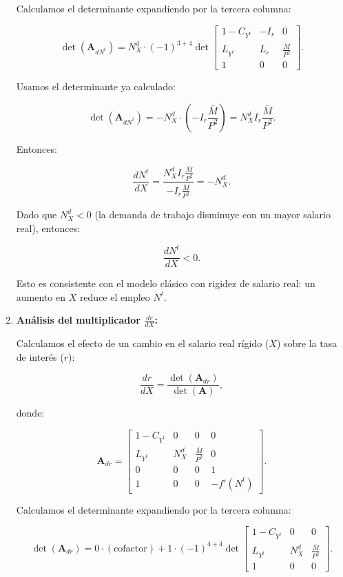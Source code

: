\documentclass[
  doc,
  floatsintext,
  longtable,
  a4paper,
  nolmodern,
  notxfonts,
  notimes,
  colorlinks=true,linkcolor=blue,citecolor=blue,urlcolor=blue]{apa7}
\begin{document}
\begin{enumerate}
  Calculamos el determinante expandiendo por la tercera columna:

  \[
  \det(\mathbf{A}_{dN^t}) = N^d_X \cdot (-1)^{3+4} \det \begin{bmatrix}
  1 - C_{Y^t} & -I_r & 0 \\
  L_{Y^t} & L_r & \frac{\bar{M}}{P^2} \\
  1 & 0 & 0
  \end{bmatrix}.
  \]

  Usamos el determinante ya calculado:

  \[
  \det(\mathbf{A}_{dN^t}) = -N^d_X \cdot \left( -I_r \frac{\bar{M}}{P^2} \right) = N^d_X I_r \frac{\bar{M}}{P^2}.
  \]

  Entonces:

  \[
  \frac{dN^t}{dX} = \frac{N^d_X I_r \frac{\bar{M}}{P^2}}{-I_r \frac{\bar{M}}{P^2}} = -N^d_X.
  \]

  Dado que \(N^d_X < 0\) (la demanda de trabajo disminuye con un mayor
  salario real), entonces:

  \[
  \frac{dN^t}{dX} < 0.
  \]

  Esto es consistente con el modelo clásico con rigidez de salario real:
  un aumento en \(X\) reduce el empleo \(N^t\).
\item
  \textbf{Análisis del multiplicador \(\frac{dr}{dX}\):}

  Calculamos el efecto de un cambio en el salario real rígido (\(X\))
  sobre la tasa de interés (\(r\)):

  \[
  \frac{dr}{dX} = \frac{\det(\mathbf{A}_{dr})}{\det(\mathbf{A})},
  \]

  donde:

  \[
  \mathbf{A}_{dr} = \begin{bmatrix}
  1 - C_{Y^t} & 0 & 0 & 0 \\
  L_{Y^t} & N^d_X & \frac{\bar{M}}{P^2} & 0 \\
  0 & 0 & 0 & 1 \\
  1 & 0 & 0 & -f'(N^t)
  \end{bmatrix}.
  \]

  Calculamos el determinante expandiendo por la tercera columna:

  \[
  \det(\mathbf{A}_{dr}) = 0 \cdot (\text{cofactor}) + 1 \cdot (-1)^{4+4} \det \begin{bmatrix}
  1 - C_{Y^t} & 0 & 0 \\
  L_{Y^t} & N^d_X & \frac{\bar{M}}{P^2} \\
  1 & 0 & 0
  \end{bmatrix}.
  \]


\end{enumerate}
\end{document}
